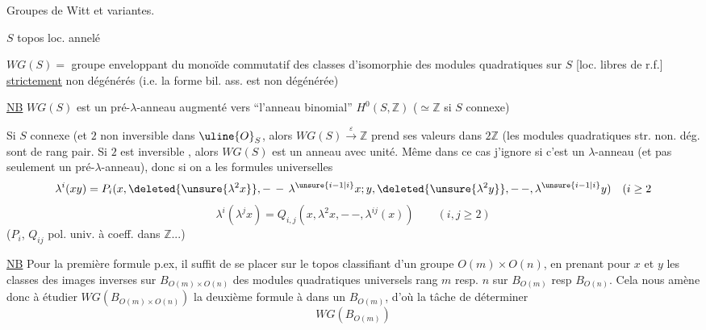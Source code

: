 Groupes de Witt et variantes.

$S$ topos loc. annelé

$WG(S)=$ groupe enveloppant du monoïde commutatif
 des classes d'isomorphie des modules quadratiques
 sur $S$ [loc. libres de r.f.] \uline{strictement} non
 dégénérés (i.e. la forme bil. ass. est non
 dégénérée)

\uline{NB} $WG(S)$ est un pré-$\lambda$-anneau
 augmenté vers
``l'anneau binomial'' $H^0(S,\mathbb Z)$ ($\simeq\mathbb Z$ si $S$ connexe)

Si $S$ connexe  (et $2$ non inversible dans $\uline{O}_S$,
alors $WG(S)\xrightarrow{\varepsilon}\mathbb Z$ prend ses valeurs dans $2\mathbb Z$
(les modules quadratiques str. non. dég. sont de
rang pair. Si $2$ est inversible , alors
$WG(S)$ est un anneau avec unité. Même
dans ce cas j'ignore si c'est un $\lambda$-anneau
(et pas seulement un pré-$\lambda$-anneau), donc
si on a les formules universelles
\[
\lambda^i(xy)=P_i(x,\deleted{\unsure{\lambda^2x}},-\,-\,\lambda^{\unsure{i-1|i}}x;
 y,\deleted{\unsure{\lambda^2y}},-\,-,\lambda^{\unsure{i-1|i}}y)\quad(i\ge2
\]
\[
\lambda^i(\lambda^j x)=Q_{i,j}(x,\lambda^2x,-\,-,\lambda^{ij}(x))
\qquad(i,j\ge2)
\]
($P_i$, $Q_{ij}$ pol. univ. à coeff. dans $\mathbb Z$...)

\uline{NB} Pour la première formule p.ex, il suffit de se
placer sur le topos classifiant d'un
groupe $O(m)\times O(n)$, en prenant pour $x$ et $y$
les classes des images inverses sur $B_{O(m)\times O(n)}$
des  modules quadratiques universels
 rang $m$ resp. $n$ sur $B_{O(m)}$ resp $B_{O(n)}$.
Cela nous amène donc à étudier $WG(B_{O(m)\times O(n)})$
 la deuxième formule à  dans
un $B_{O(m)}$, d'où la tâche de déterminer
\[
WG(B_{O(m)})
\]

